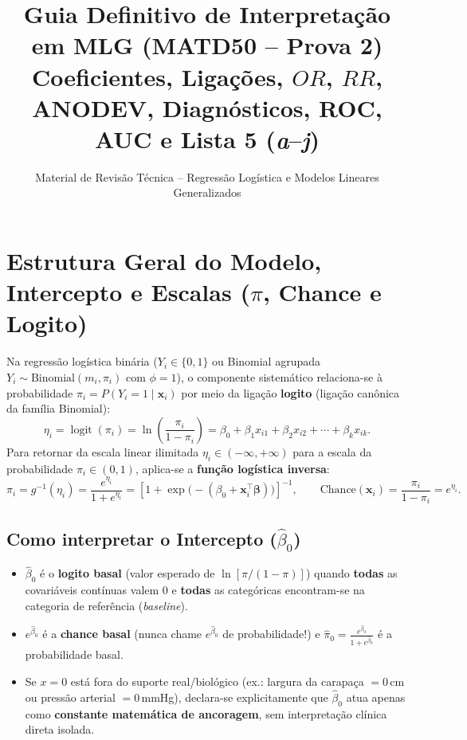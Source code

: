 \documentclass[11pt,a4paper]{article}
\title{\textbf{Guia Definitivo de Interpretação em MLG (MATD50 -- Prova 2)}\\
\large Coeficientes, Ligações, $OR$, $RR$, ANODEV, Diagnósticos, ROC, AUC e Lista 5 (\textit{a}--\textit{j})}
\author{Material de Revisão Técnica -- Regressão Logística e Modelos Lineares Generalizados}
\date{}
\begin{document}
\maketitle
\tableofcontents
\newpage

\section{Estrutura Geral do Modelo, Intercepto e Escalas ($\pi$, Chance e Logito)}

Na regressão logística binária ($Y_i \in \{0,1\}$ ou Binomial agrupada $Y_i \sim \text{Binomial}(m_i,\pi_i)$ com $\phi=1$), o componente sistemático relaciona-se à probabilidade $\pi_i = P(Y_i=1\mid \mathbf{x}_i)$ por meio da ligação \textbf{logito} (ligação canônica da família Binomial):
\[
  \eta_i = \operatorname{logit}(\pi_i) = \ln\!\left(\frac{\pi_i}{1-\pi_i}\right) = \beta_0 + \beta_1 x_{i1} + \beta_2 x_{i2} + \cdots + \beta_k x_{ik}.
\]
Para retornar da escala linear ilimitada $\eta_i \in (-\infty, +\infty)$ para a escala da probabilidade $\pi_i \in (0, 1)$, aplica-se a \textbf{função logística inversa}:
\[
  \pi_i = g^{-1}(\eta_i) = \frac{e^{\eta_i}}{1 + e^{\eta_i}} = \left[1 + \exp\!\big(-(\beta_0 + \mathbf{x}_i^\top\boldsymbol{\beta})\big)\right]^{-1},
  \qquad
  \text{Chance}(\mathbf{x}_i) = \frac{\pi_i}{1-\pi_i} = e^{\eta_i}.
\]

\subsection*{Como interpretar o Intercepto ($\hat{\beta}_0$)}
\begin{itemize}[leftmargin=1.4em]
  \item $\hat{\beta}_0$ é o \textbf{logito basal} (valor esperado de $\ln[\pi/(1-\pi)]$) quando \textbf{todas} as covariáveis contínuas valem $0$ e \textbf{todas} as categóricas encontram-se na categoria de referência (\textit{baseline}).
  \item $e^{\hat{\beta}_0}$ é a \textbf{chance basal} (nunca chame $e^{\hat{\beta}_0}$ de probabilidade!) e $\hat{\pi}_0 = \frac{e^{\hat{\beta}_0}}{1+e^{\hat{\beta}_0}}$ é a probabilidade basal.
  \item Se $x = 0$ está fora do suporte real/biológico (ex.: largura da carapaça $= 0$\,cm ou pressão arterial $= 0$\,mmHg), declara-se explicitamente que $\hat{\beta}_0$ atua apenas como \textbf{constante matemática de ancoragem}, sem interpretação clínica direta isolada.
\end{itemize}
\end{document}
